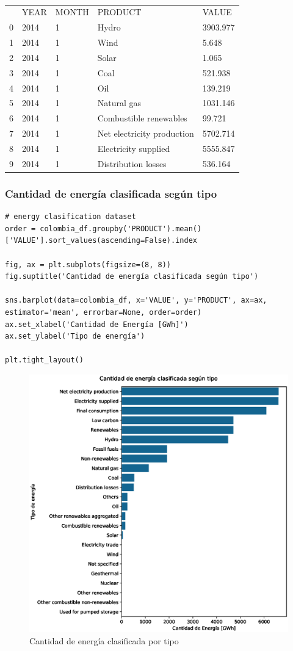 \documentclass{article}
\begin{document}
{\tt
\begin{tabular}{lllll}
	 & YEAR & MONTH & PRODUCT                    & VALUE    \\
	0   & 2014 & 1     & Hydro                      & 3903.977 \\
	1   & 2014 & 1     & Wind                       & 5.648    \\
	2   & 2014 & 1     & Solar                      & 1.065    \\
	3   & 2014 & 1     & Coal                       & 521.938  \\
	4   & 2014 & 1     & Oil                        & 139.219  \\
	5   & 2014 & 1     & Natural gas                & 1031.146 \\
	6   & 2014 & 1     & Combustible renewables     & 99.721   \\
	7   & 2014 & 1     & Net electricity production & 5702.714 \\
	8   & 2014 & 1     & Electricity supplied       & 5555.847 \\
	9   & 2014 & 1     & Distribution losses        & 536.164 
\end{tabular}
}

\subsubsection{Cantidad de energía clasificada según tipo}

\begin{verbatim}
# energy clasification dataset
order = colombia_df.groupby('PRODUCT').mean()['VALUE'].sort_values(ascending=False).index

fig, ax = plt.subplots(figsize=(8, 8))
fig.suptitle('Cantidad de energía clasificada según tipo')

sns.barplot(data=colombia_df, x='VALUE', y='PRODUCT', ax=ax, estimator='mean', errorbar=None, order=order)
ax.set_xlabel('Cantidad de Energía [GWh]')
ax.set_ylabel('Tipo de energía')

plt.tight_layout()
\end{verbatim}

\begin{figure}[t]
	\centering
	\includegraphics[width=0.7\linewidth]{fig_3}
	\caption{Cantidad de energ\'ia clasificada por tipo}
	\label{fig:fig3}
\end{figure}
\end{document}
